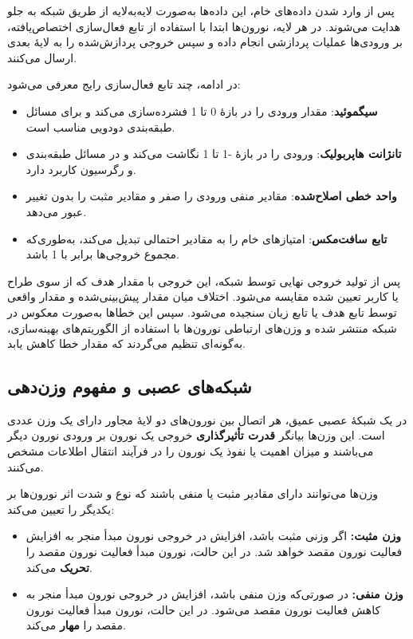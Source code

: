 پس از وارد شدن داده‌های خام، این داده‌ها به‌صورت لایه‌به‌لایه از طریق شبکه به جلو هدایت می‌شوند. در هر لایه، نورون‌ها ابتدا با استفاده از تابع فعال‌سازی اختصاص‌یافته، بر ورودی‌ها عملیات پردازشی انجام داده و سپس خروجی پردازش‌شده را به لایهٔ بعدی ارسال می‌کنند.

در ادامه، چند تابع فعال‌سازی رایج معرفی می‌شود:

\begin{itemize}
	\item \textbf{سیگموئید}: مقدار ورودی را در بازهٔ 0 تا 1 فشرده‌سازی می‌کند و برای مسائل طبقه‌بندی دودویی مناسب است.
	
	\item \textbf{تانژانت هاپربولیک}: ورودی را در بازهٔ -1 تا 1 نگاشت می‌کند و در مسائل طبقه‌بندی و رگرسیون کاربرد دارد.
	
	\item \textbf{واحد خطی اصلاح‌شده}: مقادیر منفی ورودی را صفر و مقادیر مثبت را بدون تغییر عبور می‌دهد.
	
	\item \textbf{تابع سافت‌مکس}: امتیازهای خام را به مقادیر احتمالی تبدیل می‌کند، به‌طوری‌که مجموع خروجی‌ها برابر با 1 باشد.
\end{itemize}

پس از تولید خروجی نهایی توسط شبکه، این خروجی با مقدار هدف که از سوی طراح یا کاربر تعیین شده مقایسه می‌شود. اختلاف میان مقدار پیش‌بینی‌شده و مقدار واقعی توسط تابع هدف یا تابع زیان سنجیده می‌شود. سپس این خطاها به‌صورت معکوس در شبکه منتشر شده و وزن‌های ارتباطی نورون‌ها با استفاده از الگوریتم‌های بهینه‌سازی، به‌گونه‌ای تنظیم می‌گردند که مقدار خطا کاهش یابد.

\subsection*{شبکه‌های عصبی و مفهوم وزن‌دهی}

در یک شبکهٔ عصبی عمیق، هر اتصال بین نورون‌های دو لایهٔ مجاور دارای یک وزن عددی است. این وزن‌ها بیانگر \textbf{قدرت تأثیرگذاری} خروجی یک نورون بر ورودی نورون دیگر می‌باشند و میزان اهمیت یا نفوذ یک نورون را در فرآیند انتقال اطلاعات مشخص می‌کنند.

وزن‌ها می‌توانند دارای مقادیر مثبت یا منفی باشند که نوع و شدت اثر نورون‌ها بر یکدیگر را تعیین می‌کند:

\begin{itemize}
	\item \textbf{وزن مثبت:} اگر وزنی مثبت باشد، افزایش در خروجی نورون مبدأ منجر به افزایش فعالیت نورون مقصد خواهد شد. در این حالت، نورون مبدأ فعالیت نورون مقصد را \textbf{تحریک} می‌کند.
	
	\item \textbf{وزن منفی:} در صورتی‌که وزن منفی باشد، افزایش در خروجی نورون مبدأ منجر به کاهش فعالیت نورون مقصد می‌شود. در این حالت، نورون مبدأ فعالیت نورون مقصد را \textbf{مهار} می‌کند.
\end{itemize}

